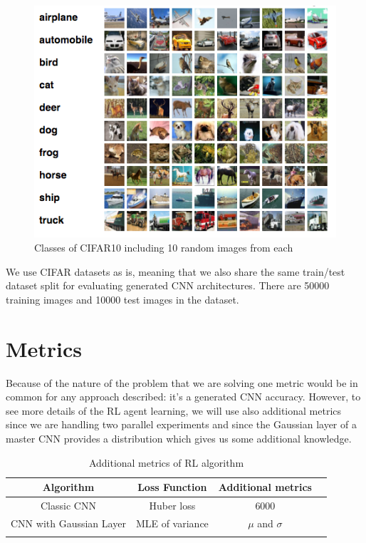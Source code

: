 \begin{figure}[!htb]
  \includegraphics[width=\linewidth]{images/cifar10example.png}
  \caption{Classes of CIFAR10 including 10 random images from each \cite{CIFAR}}
  \label{fig:cifar10}
\end{figure}

We use CIFAR datasets as is, meaning that we also share the same train/test dataset split for evaluating generated CNN architectures. There are 50000 training images and 10000 test images in the dataset.

\section{Metrics}

Because of the nature of the problem that we are solving one metric would be in common for any approach described: it's a generated CNN accuracy. However, to see more details of the RL agent learning, we will use also additional metrics since we are handling two parallel experiments and since the Gaussian layer of a master CNN provides a distribution which gives us some additional knowledge.

\begin{table}[h!]
\centering
\begin{tabular}{c c c c} 
 \hline
 Algorithm & Loss Function & Additional metrics \\ [0.5ex] 
 \hline
 Classic CNN & Huber loss & 6000 \\
 \hline
 CNN with Gaussian Layer & MLE of variance & $\mu$ and $\sigma$ \\
 \hline \\ [0.5ex]
\end{tabular}
\caption{Additional metrics of RL algorithm}
\label{table:2}
\end{table}

